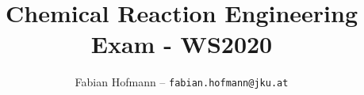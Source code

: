 \documentclass[12pt]{article}
\title{Chemical Reaction Engineering Exam - WS2020}
\author{Fabian Hofmann -- \texttt{fabian.hofmann@jku.at}}
\newcounter{question}[question]
\begin{document}
\newcommand{\pySI}[2]{\py{'\\SI{' + str(#1) + '}{#2}'}}
\newcommand{\pyNum}[1]{\py{'\\num{' + str(#1) + '}'}}

\pagestyle{plain}
\maketitle








\end{document}
